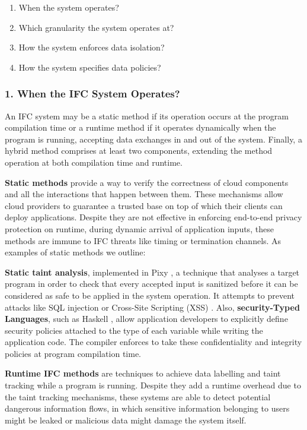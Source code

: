 \begin{enumerate}
\item When the system operates?%
\item Which granularity the system operates at?%
\item How the system enforces data isolation?%
\item How the system specifies data policies?
\end{enumerate}

\subsubsection{1. When the IFC System Operates?}
An IFC system may be a static method if its operation occurs at the program compilation time or a runtime method if it operates dynamically when the program is running, accepting data exchanges in and out of the system. Finally, a hybrid method comprises at least two components, extending the method operation at both compilation time and runtime.

\textbf{Static methods} provide a way to verify the correctness of cloud components and all the interactions that happen between them. These mechanisms allow cloud providers to guarantee a trusted base on top of which their clients can deploy applications. Despite they are not effective in enforcing end-to-end privacy protection on runtime, during dynamic arrival of application inputs, these methods are immune to IFC threats like timing or termination channels. As examples of static methods we outline:

\textbf{Static taint analysis}, implemented in Pixy \cite{pixy}, a technique that analyses a target program in order to check that every accepted input is sanitized before it can be considered as safe to be applied in the system operation. It attempts to prevent attacks like SQL injection or Cross-Site Scripting (XSS) \cite{xss}. Also, \textbf{security-Typed Languages}, such as Haskell \cite{haskell}, allow application developers to explicitly define security policies attached to the type of each variable while writing the application code. The compiler enforces to take these confidentiality and integrity policies at program compilation time.

\textbf{Runtime IFC methods} are techniques to achieve data labelling and taint tracking while a program is running. Despite they add a runtime overhead due to the taint tracking mechanisms, these systems are able to detect potential dangerous information flows, in which sensitive information belonging to users might be leaked or malicious data might damage the system itself.

